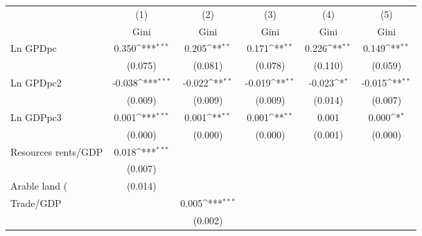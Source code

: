 {
\def\sym#1{\ifmmode^{#1}\else\(^{#1}\)\fi}
\begin{tabular}{l*{5}{c}}
\hline\hline
                    &\multicolumn{1}{c}{(1)}&\multicolumn{1}{c}{(2)}&\multicolumn{1}{c}{(3)}&\multicolumn{1}{c}{(4)}&\multicolumn{1}{c}{(5)}\\
                    &\multicolumn{1}{c}{Gini}&\multicolumn{1}{c}{Gini}&\multicolumn{1}{c}{Gini}&\multicolumn{1}{c}{Gini}&\multicolumn{1}{c}{Gini}\\
\hline
Ln GPDpc            &       0.350\sym{***}&       0.205\sym{**} &       0.171\sym{**} &       0.226\sym{**} &       0.149\sym{**} \\
                    &     (0.075)         &     (0.081)         &     (0.078)         &     (0.110)         &     (0.059)         \\
[1em]
Ln GPDpc2           &      -0.038\sym{***}&      -0.022\sym{**} &      -0.019\sym{**} &      -0.023\sym{*}  &      -0.015\sym{**} \\
                    &     (0.009)         &     (0.009)         &     (0.009)         &     (0.014)         &     (0.007)         \\
[1em]
Ln GDPpc3           &       0.001\sym{***}&       0.001\sym{**} &       0.001\sym{**} &       0.001         &       0.000\sym{*}  \\
                    &     (0.000)         &     (0.000)         &     (0.000)         &     (0.001)         &     (0.000)         \\
[1em]
Resources rents/GDP &       0.018\sym{***}&                     &                     &                     &                     \\
                    &     (0.007)         &                     &                     &                     &                     \\
[1em]
Arable land (%
                    &     (0.014)         &                     &                     &                     &                     \\
[1em]
Trade/GDP           &                     &       0.005\sym{***}&                     &                     &                     \\
                    &                     &     (0.002)         &                     &                     &                     \\

\end{tabular}}
